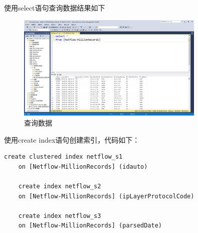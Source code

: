 \documentclass[UTF8,12pt]{article}
\begin{document}
使用select语句查询数据结果如下
\begin{figure}[htbp]
    \centering
    \includegraphics[width=0.8\textwidth]{img/10.png}
    \caption{查询数据}
\end{figure}



使用create index语句创建索引，代码如下：
\begin{lstlisting}[title=create index,frame=shadowbox]
    create clustered index netflow_s1
    on [Netflow-MillionRecords] (idauto)
    
    create index netflow_s2
    on [Netflow-MillionRecords] (ipLayerProtocolCode)
    
    create index netflow_s3
    on [Netflow-MillionRecords] (parsedDate)
\end{lstlisting}
\end{document}
